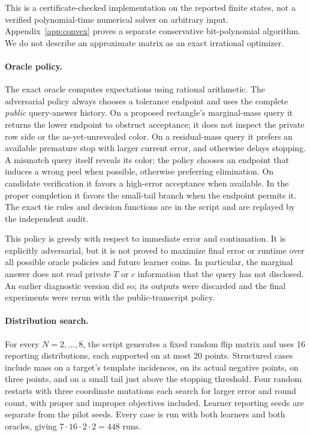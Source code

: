 This is a certificate-checked implementation on the reported finite states, not a verified polynomial-time numerical solver on arbitrary input. Appendix~\ref{app:convex} proves a separate conservative bit-polynomial algorithm. We do not describe an approximate matrix as an exact irrational optimizer.

\paragraph{Oracle policy.}
The exact oracle computes expectations using rational arithmetic. The adversarial policy always chooses a tolerance endpoint and uses the complete \emph{public} query-answer history. On a proposed rectangle's marginal-mass query it returns the lower endpoint to obstruct acceptance; it does not inspect the private row side or the as-yet-unrevealed color. On a residual-mass query it prefers an available premature stop with larger current error, and otherwise delays stopping. A mismatch query itself reveals its color; the policy chooses an endpoint that induces a wrong peel when possible, otherwise preferring elimination. On candidate verification it favors a high-error acceptance when available. In the proper completion it favors the small-tail branch when the endpoint permits it. The exact tie rules and decision functions are in the script and are replayed by the independent audit.

This policy is greedy with respect to immediate error and continuation. It is explicitly adversarial, but it is not proved to maximize final error or runtime over all possible oracle policies and future learner coins. In particular, the marginal answer does not read private $T$ or $c$ information that the query has not disclosed. An earlier diagnostic version did so; its outputs were discarded and the final experiments were rerun with the public-transcript policy.

\paragraph{Distribution search.}
For every $N=2,\ldots,8$, the script generates a fixed random flip matrix and uses 16 reporting distributions, each supported on at most 20 points. Structured cases include mass on a target's template incidences, on its actual negative points, on three points, and on a small tail just above the stopping threshold. Four random restarts with three coordinate mutations each search for larger error and round count, with proper and improper objectives included. Learner reporting seeds are separate from the pilot seeds. Every case is run with both learners and both oracles, giving $7\cdot16\cdot2\cdot2=448$ runs.

